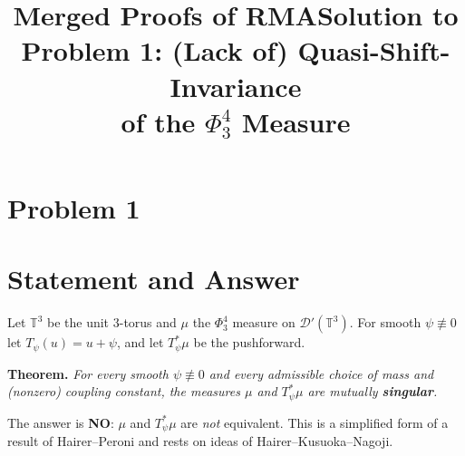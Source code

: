 \documentclass[11pt]{article}
\title{Merged Proofs of RMA}
\author{}
\date{}
\begin{document}
\maketitle
\tableofcontents


\clearpage
\section*{Problem 1}
\begingroup
\hypersetup{colorlinks=true,
            linkcolor=blue!50!black,
            citecolor=blue!50!black,
            urlcolor=blue!50!black}
\newcommand{\qoneT}{\mathbb{T}}
\newcommand{\qoneR}{\mathbb{R}}
\newcommand{\qoneN}{\mathbb{N}}
\newcommand{\qoneC}{\mathcal{C}}
\newcommand{\qoneD}{\mathcal{D}}
\newcommand{\qoneE}{\mathbb{E}}
\newcommand{\qoneHp}{H}      %
\newcommand{\qonePN}{P_N}
\newcommand{\qoneLin}{\mathbf{l}}   %
\newcommand{\qoneLsq}{\mathbf{q}}   %
\newcommand{\qoneLcb}{\mathbf{c}}   %
\newcommand{\qoneIqc}{\mathbf{C}}   %
\newtheorem{qonetheorem}{Theorem}
\newtheorem{qonelemma}{Lemma}
\newtheorem{qoneproposition}{Proposition}
\newtheorem{qonecorollary}{Corollary}
\title{Solution to Problem 1: (Lack of) Quasi-Shift-Invariance\\
of the $\Phi^4_3$ Measure}
\author{}
\date{}
\maketitle


\section*{Statement and Answer}

Let $\qoneT^3$ be the unit $3$-torus and $\mu$ the $\Phi^4_3$ measure on
$\qoneD'(\qoneT^3)$. For smooth $\psi\not\equiv0$ let $T_\psi(u)=u+\psi$, and let
$T_\psi^*\mu$ be the pushforward.

\medskip
\noindent\textbf{Theorem.} \emph{For every smooth $\psi\not\equiv0$ and every
admissible choice of mass and (nonzero) coupling constant, the measures $\mu$ and
$T_\psi^*\mu$ are mutually \textbf{singular}.}

\medskip
\noindent The answer is \textbf{NO}: $\mu$ and $T_\psi^*\mu$ are \emph{not}
equivalent. This is a simplified form of a result of Hairer--Peroni and rests on
ideas of Hairer--Kusuoka--Nagoji.
\end{document}
